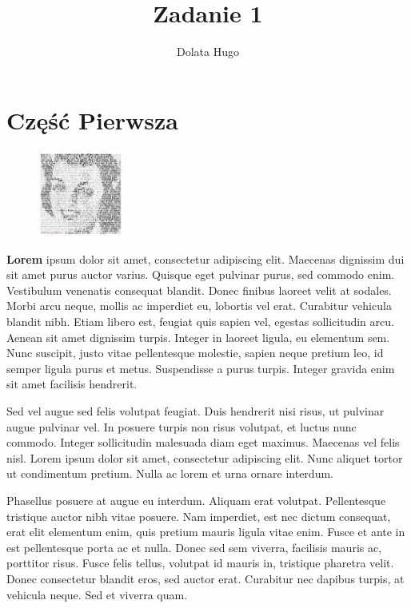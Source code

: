 \documentclass[]{article}
\title{Zadanie 1}
\author{Dolata Hugo}
\begin{document}
\maketitle

\newpage
\tableofcontents
\newpage
\section{Część Pierwsza}

\begin{figure}
	\centering
	\includegraphics[width=0.25\textwidth]{lorem}
\end{figure}

\textbf{Lorem} \cite{pierwszy} ipsum dolor sit amet, consectetur adipiscing elit. Maecenas dignissim dui sit amet purus auctor varius. Quisque eget pulvinar purus, sed commodo enim. Vestibulum venenatis consequat blandit. Donec finibus laoreet velit at sodales. Morbi arcu neque, mollis ac imperdiet eu, lobortis vel erat. Curabitur vehicula blandit nibh. Etiam libero est, feugiat quis sapien vel, egestas sollicitudin arcu. Aenean sit amet dignissim turpis. Integer in laoreet ligula, eu elementum sem. Nunc suscipit, justo vitae pellentesque molestie, sapien neque pretium leo, id semper ligula purus et metus. Suspendisse a purus turpis. Integer gravida enim sit amet facilisis hendrerit.

Sed vel augue sed felis volutpat feugiat. Duis hendrerit nisi risus, ut pulvinar augue pulvinar vel. In posuere turpis non risus volutpat, et luctus nunc commodo. Integer sollicitudin malesuada diam eget maximus. Maecenas vel felis nisl. Lorem ipsum dolor sit amet, consectetur adipiscing elit. Nunc aliquet tortor ut condimentum pretium. Nulla ac lorem et urna ornare interdum.

Phasellus posuere at augue eu interdum. Aliquam erat volutpat. Pellentesque tristique auctor nibh vitae posuere. Nam imperdiet, est nec dictum consequat, erat elit elementum enim, quis pretium mauris ligula vitae enim. Fusce et ante in est pellentesque porta ac et nulla. Donec sed sem viverra, facilisis mauris ac, porttitor risus. Fusce felis tellus, volutpat id mauris in, tristique pharetra velit. Donec consectetur blandit eros, sed auctor erat. Curabitur nec dapibus turpis, at vehicula neque. Sed et viverra quam.
\end{document}
